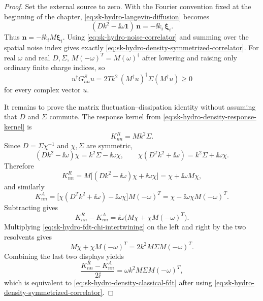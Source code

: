 \begin{proof}
Set the external source to zero.  With the Fourier convention fixed at the
beginning of the chapter,
\eqref{eq:sk-hydro-langevin-diffusion} becomes
\begin{equation}
  (Dk^2-\ii\omega\mathbf 1)\,\mathbf n
  =
  -\ii k_i\,\boldsymbol\xi_i .
  \label{eq:sk-hydro-langevin-fourier-saddle}
\end{equation}
Thus \(\mathbf n=-\ii k_iM\boldsymbol\xi_i\).  Using
\eqref{eq:sk-hydro-noise-correlator} and summing over the spatial noise
index gives exactly
\eqref{eq:sk-hydro-density-symmetrized-correlator}.  For real \(\omega\) and
real \(D,\Sigma\), \(M(-\omega)^T=M(\omega)^\dagger\) after lowering and
raising only ordinary finite charge indices, so
\begin{equation}
  u^\dagger G^S_{nn}u
  =
  2Tk^2\,(M^\dagger u)^\dagger\Sigma(M^\dagger u)\ge0
  \label{eq:sk-hydro-density-correlator-positivity}
\end{equation}
for every complex vector \(u\).

It remains to prove the matrix fluctuation--dissipation identity without
assuming that \(D\) and \(\Sigma\) commute.  The response kernel from
\eqref{eq:sk-hydro-density-response-kernel} is
\begin{equation}
  K^R_{nn}=M k^2\Sigma .
  \label{eq:sk-hydro-density-retarded-matrix-proof}
\end{equation}
Since \(D=\Sigma\chi^{-1}\) and \(\chi,\Sigma\) are symmetric,
\begin{equation}
  (Dk^2-\ii\omega)\chi=k^2\Sigma-\ii\omega\chi,
  \qquad
  \chi(D^Tk^2+\ii\omega)=k^2\Sigma+\ii\omega\chi .
  \label{eq:sk-hydro-fdt-chi-intertwining}
\end{equation}
Therefore
\begin{equation}
  K^R_{nn}
  =
  M\bigl[(Dk^2-\ii\omega)\chi+\ii\omega\chi\bigr]
  =
  \chi+\ii\omega M\chi ,
  \label{eq:sk-hydro-fdt-retarded-rewrite}
\end{equation}
and similarly
\begin{equation}
  K^A_{nn}
  =
  \bigl[\chi(D^Tk^2+\ii\omega)-\ii\omega\chi\bigr]M(-\omega)^T
  =
  \chi-\ii\omega\chi M(-\omega)^T .
  \label{eq:sk-hydro-fdt-advanced-rewrite}
\end{equation}
Subtracting gives
\begin{equation}
  K^R_{nn}-K^A_{nn}
  =
  \ii\omega\bigl(M\chi+\chi M(-\omega)^T\bigr).
  \label{eq:sk-hydro-fdt-difference-first}
\end{equation}
Multiplying
\eqref{eq:sk-hydro-fdt-chi-intertwining} on the left and right by the two
resolvents gives
\begin{equation}
  M\chi+\chi M(-\omega)^T
  =
  2k^2M\Sigma M(-\omega)^T .
  \label{eq:sk-hydro-fdt-resolvent-identity}
\end{equation}
Combining the last two displays yields
\begin{equation}
  \frac{K^R_{nn}-K^A_{nn}}{2\ii}
  =
  \omega k^2M\Sigma M(-\omega)^T ,
  \label{eq:sk-hydro-fdt-spectral-density}
\end{equation}
which is equivalent to
\eqref{eq:sk-hydro-density-classical-fdt} after using
\eqref{eq:sk-hydro-density-symmetrized-correlator}.
\end{proof}

